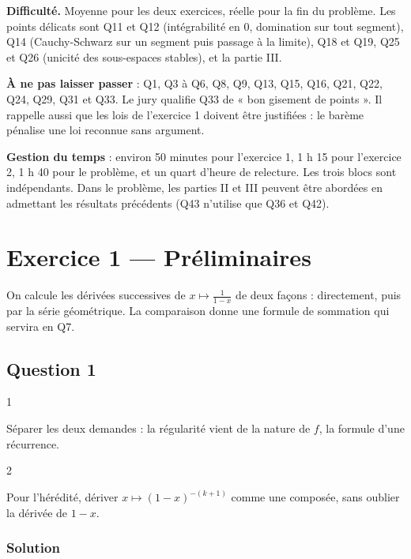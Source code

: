 \documentclass[11pt,a4paper]{article}
\begin{document}
\textbf{Difficulté.} Moyenne pour les deux exercices, réelle pour la fin du problème. Les points délicats sont Q11 et Q12 (intégrabilité en \(0\), domination sur tout segment), Q14 (Cauchy-Schwarz sur un segment puis passage à la limite), Q18 et Q19, Q25 et Q26 (unicité des sous-espaces stables), et la partie III.

\textbf{À ne pas laisser passer} : Q1, Q3 à Q6, Q8, Q9, Q13, Q15, Q16, Q21, Q22, Q24, Q29, Q31 et Q33. Le jury qualifie Q33 de « bon gisement de points ». Il rappelle aussi que les lois de l'exercice 1 doivent être justifiées : le barème pénalise une loi reconnue sans argument.

\textbf{Gestion du temps} : environ 50 minutes pour l'exercice 1, 1 h 15 pour l'exercice 2, 1 h 40 pour le problème, et un quart d'heure de relecture. Les trois blocs sont indépendants. Dans le problème, les parties II et III peuvent être abordées en admettant les résultats précédents (Q43 n'utilise que Q36 et Q42).

\hypertarget{exercice-1-pruxe9liminaires}{%
\section{Exercice 1 --- Préliminaires}\label{exercice-1-pruxe9liminaires}}

On calcule les dérivées successives de \(x\mapsto\frac1{1-x}\) de deux façons : directement, puis par la série géométrique. La comparaison donne une formule de sommation qui servira en Q7.

\hypertarget{question-1}{%
\subsection{Question 1}\label{question-1}}

\begin{indication}{1}

Séparer les deux demandes : la régularité vient de la nature de \(f\), la formule d'une récurrence.

\end{indication}

\begin{indication}{2}

Pour l'hérédité, dériver \(x\mapsto(1-x)^{-(k+1)}\) comme une composée, sans oublier la dérivée de \(1-x\).

\end{indication}

\hypertarget{solution}{%
\subsubsection{Solution}\label{solution}}
\end{document}
